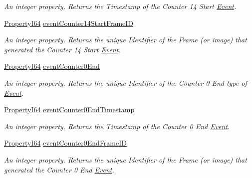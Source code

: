 \begin{DoxyCompactItemize}
\begin{DoxyCompactList}\small\item\em An integer property. Returns the Timestamp of the Counter 14 Start \hyperlink{classmv_i_m_p_a_c_t_1_1acquire_1_1_event}{Event}. \end{DoxyCompactList}\item 
\hyperlink{group___common_interface_ga81749b2696755513663492664a18a893}{Property\+I64} \hyperlink{classmv_i_m_p_a_c_t_1_1acquire_1_1_gen_i_cam_1_1_event_control_a435210f231fdbbdcf7d0eecc6fd6e061}{event\+Counter14\+Start\+Frame\+I\+D}
\begin{DoxyCompactList}\small\item\em An integer property. Returns the unique Identifier of the Frame (or image) that generated the Counter 14 Start \hyperlink{classmv_i_m_p_a_c_t_1_1acquire_1_1_event}{Event}. \end{DoxyCompactList}\item 
\hyperlink{group___common_interface_ga81749b2696755513663492664a18a893}{Property\+I64} \hyperlink{classmv_i_m_p_a_c_t_1_1acquire_1_1_gen_i_cam_1_1_event_control_a12d4a0f273432ab029e5ddd9cc4e5586}{event\+Counter0\+End}
\begin{DoxyCompactList}\small\item\em An integer property. Returns the unique Identifier of the Counter 0 End type of \hyperlink{classmv_i_m_p_a_c_t_1_1acquire_1_1_event}{Event}. \end{DoxyCompactList}\item 
\hyperlink{group___common_interface_ga81749b2696755513663492664a18a893}{Property\+I64} \hyperlink{classmv_i_m_p_a_c_t_1_1acquire_1_1_gen_i_cam_1_1_event_control_a1150012d4c6379d5fe85f3cc09cea1a5}{event\+Counter0\+End\+Timestamp}
\begin{DoxyCompactList}\small\item\em An integer property. Returns the Timestamp of the Counter 0 End \hyperlink{classmv_i_m_p_a_c_t_1_1acquire_1_1_event}{Event}. \end{DoxyCompactList}\item 
\hyperlink{group___common_interface_ga81749b2696755513663492664a18a893}{Property\+I64} \hyperlink{classmv_i_m_p_a_c_t_1_1acquire_1_1_gen_i_cam_1_1_event_control_a81b67628ae7d3fe1448ba775557adad0}{event\+Counter0\+End\+Frame\+I\+D}
\begin{DoxyCompactList}\small\item\em An integer property. Returns the unique Identifier of the Frame (or image) that generated the Counter 0 End \hyperlink{classmv_i_m_p_a_c_t_1_1acquire_1_1_event}{Event}. \end{DoxyCompactList}\item 

\end{DoxyCompactItemize}
